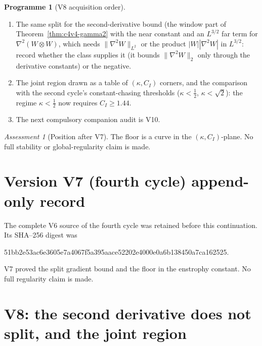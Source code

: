 \documentclass[11pt]{article}
\theoremstyle{plain}
\theoremstyle{definition}
\newtheorem{programme}[theorem]{Programme}
\theoremstyle{remark}
\newtheorem{assessment}[theorem]{Assessment}
\begin{document}
\begin{programme}[V8 acquisition order]
\label{prog:c4v8}
\begin{enumerate}[label=\textup{(AC\arabic*)},leftmargin=4.8em]
\item The same split for the second-derivative bound (the window
      part of Theorem~\ref{thm:c4v4-gamma2} with the near constant and
      an \(L^{3/2}\) far term for \(\nabla^2(W\otimes W)\), which needs \(\|\nabla^2W\|_{L^2}\) or the
      product \(|W||\nabla^2W|\) in \(L^{3/2}\): record whether the class supplies it
      (it bounds \(\|\nabla^2W\|_2\) only through the derivative constants) or
      the negative.
\item The joint region drawn as a table of \((\kappa,C_I)\) corners, and the
      comparison with the second cycle's constant-chasing thresholds
      (\(\kappa<\frac12\), \(\kappa<\sqrt2\)): the regime \(\kappa<\frac12\) now requires \(C_I\ge1.44\).
\item The next compulsory companion audit is V10.
\end{enumerate}
\end{programme}

\begin{assessment}[Position after V7]
\label{ass:c4v7-position}
The floor is a curve in the \((\kappa,C_I)\)-plane.  No full stability or
global-regularity claim is made.
\end{assessment}

\section*{Version V7 (fourth cycle) append-only record}

The complete V6 source of the fourth cycle was retained before this
continuation.  Its SHA--256 digest was
\begin{center}\scriptsize\ttfamily
51bb2e53ac6e3605e7a4067f5a395aace52202e4000e0a6b138450a7ca162525.
\end{center}
V7 proved the split gradient bound and the floor in the enstrophy
constant.  No full regularity claim is made.

\section{V8: the second derivative does not split, and the joint region}
\label{sec:c4v8-entry}
\end{document}
